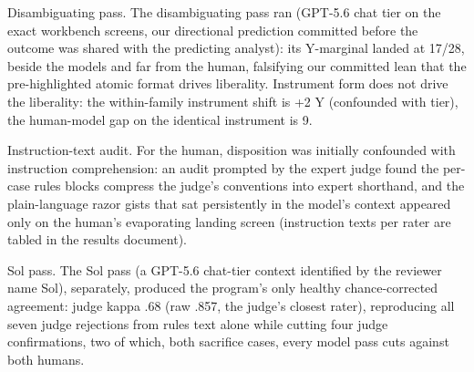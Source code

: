 \documentclass[11pt]{article}
\begin{document}
Disambiguating pass. The disambiguating pass ran (GPT-5.6 chat tier on
the exact workbench screens, our directional prediction committed before
the outcome was shared with the predicting analyst): its Y-marginal
landed at 17/28, beside the models and far from the human, falsifying
our committed lean that the pre-highlighted atomic format drives
liberality. Instrument form does not drive the liberality: the
within-family instrument shift is +2 Y (confounded with tier), the
human-model gap on the identical instrument is 9.

Instruction-text audit. For the human, disposition was initially
confounded with instruction comprehension: an audit prompted by the
expert judge found the per-case rules blocks compress the judge's
conventions into expert shorthand, and the plain-language razor gists
that sat persistently in the model's context appeared only on the
human's evaporating landing screen (instruction texts per rater are
tabled in the results document).

Sol pass. The Sol pass (a GPT-5.6 chat-tier context identified by the
reviewer name Sol), separately, produced the program's only healthy
chance-corrected agreement: judge kappa .68 (raw .857, the judge's
closest rater), reproducing all seven judge rejections from rules text
alone while cutting four judge confirmations, two of which, both
sacrifice cases, every model pass cuts against both humans.
\end{document}
